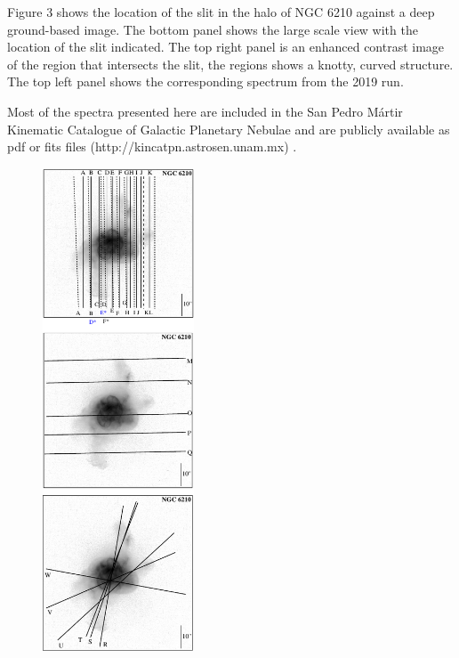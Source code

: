 \documentclass[useAMS, usenatbib]{mnras}
\begin{document}
Figure 3 shows the location of the slit in the halo of NGC 6210  against a deep ground-based image. The bottom panel shows the large scale view with the location of the slit indicated. The top right panel is an enhanced contrast image of the region that intersects the slit, the regions shows a knotty, curved structure. The top left panel shows the corresponding spectrum from the 2019 run.


Most of the spectra presented here are included in the San Pedro M\'artir Kinematic Catalogue of Galactic Planetary Nebulae and are publicly available as pdf or fits files (http://kincatpn.astrosen.unam.mx)
\citep{Lopez:2012a}.

 \begin{figure}
\centering
  \includegraphics[width=0.4\textwidth]{tere-figs/Figure-i+s}
  \caption{ }
\end{figure}
\end{document}
